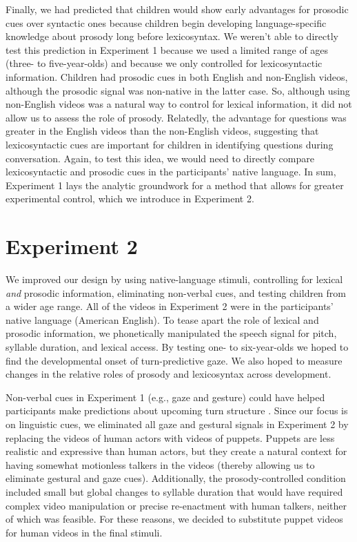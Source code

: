 \documentclass[authoryear, 12pt]{elsarticle}
\begin{document}
Finally, we had predicted that children would show early advantages for prosodic cues over syntactic ones because children begin developing language-specific knowledge about prosody long before lexicosyntax. We weren't able to directly test this prediction in Experiment 1 because we used a limited range of ages (three- to five-year-olds) and because we only controlled for lexicosyntactic information. Children had prosodic cues in both English and non-English videos, although the prosodic signal was non-native in the latter case. So, although using non-English videos was a natural way to control for lexical information, it did not allow us to assess the role of prosody. Relatedly, the advantage for questions was greater in the English videos than the non-English videos, suggesting that lexicosyntactic cues are important for children in identifying questions during conversation. Again, to test this idea, we would need to directly compare lexicosyntactic and prosodic cues in the participants' native language. In sum, Experiment 1 lays the analytic groundwork for a method that allows for greater experimental control, which we introduce in Experiment 2. 


\section{Experiment 2}
\label{sec:exp2}

We improved our design by using native-language stimuli, controlling for lexical \textit{and} prosodic information, eliminating non-verbal cues, and testing children from a wider age range. All of the videos in Experiment 2 were in the participants' native language (American English). To tease apart the role of lexical and prosodic information, we phonetically manipulated the speech signal for pitch, syllable duration, and lexical access. By testing one- to six-year-olds we hoped to find the developmental onset of turn-predictive gaze. We also hoped to measure changes in the relative roles of prosody and lexicosyntax across development.

Non-verbal cues in Experiment 1 (e.g., gaze and gesture) could have helped participants make predictions about upcoming turn structure  \citep{rossano2009, stivers2010}. Since our focus is on linguistic cues, we eliminated all gaze and gestural signals in Experiment 2 by replacing the videos of human actors with videos of puppets. Puppets are less realistic and expressive than human actors, but they create a natural context for having somewhat motionless talkers in the videos (thereby allowing us to eliminate gestural and gaze cues). Additionally, the prosody-controlled condition included small but global changes to syllable duration that would have required complex video manipulation or precise re-enactment with human talkers, neither of which was feasible. For these reasons, we decided to substitute puppet videos for human videos in the final stimuli. 
\end{document}
